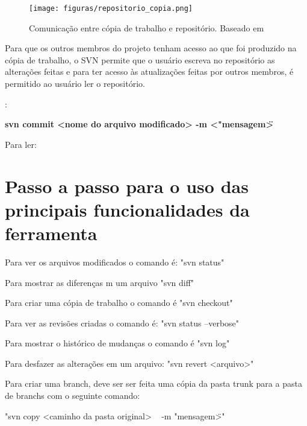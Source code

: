 \begin{figure}[!htb]
\centering
\texttt{[image: figuras/repositorio\_copia.png]}
\caption{Comunicação entre cópia de trabalho e repositório. Baseado em \cite{svn-book}}
\end{figure}


Para que os outros membros do projeto tenham acesso ao que foi produzido na cópia de trabalho, o SVN permite que o usuário escreva no repositório as alterações feitas
e para ter acesso às atualizações feitas por outros membros, é permitido ao usuário ler o repositório. \cite{svn-book}

\begin{multicols}{2} 


:{

\colorbox{PineGreen}{
\begin{minipage}{210px}
  \textbf{svn commit <nome do arquivo modificado> -m <"mensagem\">}
\end{minipage}
}
}

Para ler:

\colorbox{PineGreen}{
\begin{minipage}{100px}
\end{minipage}
}

\end{multicols}

\section{Passo a passo para o uso das principais funcionalidades da ferramenta}

Para ver os arquivos modificados o comando é: "svn status"

Para mostrar as diferenças m um arquivo "svn diff"

Para criar uma cópia de trabalho o comando é "svn checkout"

Para ver as revisões criadas o comando é: "svn status --verbose"

Para mostrar o histórico de mudanças o comando é "svn log"

Para desfazer as alterações em um arquivo: "svn revert <arquivo>"

Para criar uma branch, deve ser ser feita uma cópia da pasta trunk para a pasta de branchs com o seguinte comando:

"svn copy <caminho da pasta original> \ <caminho da pasta de destino, essa pasta deve possuir o nome da branch> -m "mensagem\">"

